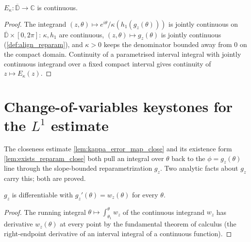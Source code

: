 \begin{lemma}


  \label{lem:kappa_error_map_continuous}
  $E_\kappa : \overline{\mathbb{D}}\to\mathbb{C}$ is continuous.
\end{lemma}
\begin{proof}
  \leanok
  The integrand $(z,\theta)\mapsto e^{i\theta}/\kappa(h_1(g_z(\theta)))$ is jointly
  continuous on $\overline{\mathbb{D}}\times[0,2\pi]$: $\kappa,h_1$ are continuous,
  $(z,\theta)\mapsto g_z(\theta)$ is jointly continuous (\cref{def:align_reparam}),
  and $\kappa>0$ keeps the denominator bounded away from $0$ on the compact domain.
  Continuity of a parametrised interval integral with jointly continuous integrand
  over a fixed compact interval gives continuity of $z\mapsto E_\kappa(z)$.
\end{proof}

\section{Change-of-variables keystones for the \texorpdfstring{$L^1$}{L1} estimate}

The closeness estimate \cref{lem:kappa_error_map_close} and its existence form
\cref{lem:exists_reparam_close} both pull an integral over $\theta$ back to the
$\phi=g_z(\theta)$ line through the slope-bounded reparametrization $g_z$. Two
analytic facts about $g_z$ carry this; both are proved.

\begin{lemma}

  \label{lem:has_deriv_align_reparam}
  $g_z$ is differentiable with $g_z'(\theta)=w_z(\theta)$ for every $\theta$.
\end{lemma}
\begin{proof}
  \leanok
  The running integral $\theta\mapsto\int_{\theta_1}^{\theta}w_z$ of the continuous
  integrand $w_z$ has derivative $w_z(\theta)$ at every point by the fundamental
  theorem of calculus (the right-endpoint derivative of an interval integral of a
  continuous function).
\end{proof}

